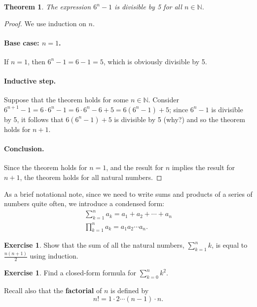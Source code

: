 \documentclass[a4paper,leqno]{article}
\numberwithin{equation}{section}
\newtheorem{thm}[equation]{Theorem}
\theoremstyle{definition}
\newtheorem{exercise}[equation]{Exercise}
\theoremstyle{remark}
\newcommand{\df}[1]{\textbf{#1}}
\begin{document}
\begin{thm}
  The expression $ 6^n - 1 $ is divisible by 5 for all $ n \in \mathbb{N} $.
\end{thm}
\begin{proof}
  We use induction on $ n $.

  \paragraph{Base case: $ n = 1 $.}
  If $ n = 1 $, then $ 6^n - 1 = 6 - 1 = 5 $, which is obviously divisible by 5.

  \paragraph{Inductive step.}
  Suppose that the theorem holds for some $ n \in \mathbb{N} $. Consider $ 6^{n + 1} - 1 = 6 \cdot 6^n - 1 = 6 \cdot 6^n - 6 + 5 = 6(6^n - 1) + 5 $;
  since $ 6^n - 1 $ is divisible by 5, it follows that $ 6(6^n - 1) + 5 $ is divisible by 5 (why?) and so the theorem holds for $ n + 1 $.

  \paragraph{Conclusion.}
  Since the theorem holds for $ n = 1 $, and the result for $ n $ implies the result for $ n + 1 $, the theorem holds for all natural numbers.
\end{proof}

As a brief notational note, since we need to write sums and products of a series of numbers quite often, we introduce a condensed form:
\begin{gather}
  \sum_{k = 1}^n a_k = a_1 + a_2 + \cdots + a_n\\
  \prod_{k = 1}^n a_k = a_1 a_2 \cdots a_n.
\end{gather}

\begin{exercise}\label{ex:w1}
  Show that the sum of all the natural numbers, $ \sum_{k = 1}^n k $, is equal to $ \frac{n(n+1)}{2} $ using induction.
\end{exercise}

\begin{exercise}
  Find a closed-form formula for $ \sum_{k = 0}^n k^2 $.
\end{exercise}

Recall also that the \df{factorial} of $ n $ is defined by
\begin{displaymath}
  n! = 1 \cdot 2 \cdots (n - 1) \cdot n.
\end{displaymath}
\end{document}
